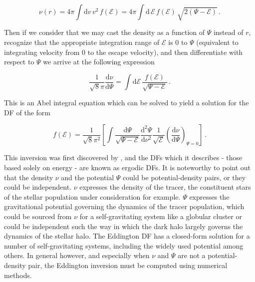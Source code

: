 \begin{equation}
    \label{ch1:eq:spherical-df-density}
    \nu(r) = 4\pi \int \mathrm{d} v \, v^{2} \, f(\mathcal{E}) = 4\pi \int \mathrm{d} \, \mathcal{E} \, f(\mathcal{E}) \, \sqrt{ 2(\Psi - \mathcal{E}) }\,.
\end{equation}

\noindent Then if we consider that we may cast the density as a function of $\Psi$ instead of $r$, recognize that the appropriate integration range of $\mathcal{E}$ is 0 to $\Psi$ (equivalent to integrating velocity from 0 to the escape velocity), and then differentiate with respect to $\Psi$ we arrive at the following expression

\begin{equation}
    \label{ch1:eq:spherical-df-density-derivative}
    \frac{1}{\sqrt{8}\pi} \frac{\mathrm{d} \nu}{\mathrm{d} \Psi} =  \int \mathrm{d} \mathcal{E} \, \frac{ f(\mathcal{E}) }{ \sqrt{\Psi - \mathcal{E}} }\,.
\end{equation}

\noindent This is an Abel integral equation which can be solved to yield a solution for the DF of the form

\begin{equation}
    \label{ch1:eq:eddington-inversion-df}
    f(\mathcal{E}) = \frac{1}{\sqrt{8}\pi^2} \left[ \int \frac{\mathrm{d} \Psi}{\sqrt{\Psi - \mathcal{E}}} \frac{\mathrm{d}^{2} \Psi}{\mathrm{d}\nu^{2}} \frac{1}{\sqrt{\mathcal{E}}} \left( \frac{\mathrm{d} \nu}{\mathrm{d} \Psi} \right)_{\Psi = 0} \right] \,.
\end{equation}

This inversion was first discovered by \textcite{eddington16}, and the DFs which it describes - those based solely on energy - are known as ergodic DFs. It is noteworthy to point out that the density $\nu$ and the potential $\Psi$ could be potential-density pairs, or they could be independent. $\nu$ expresses the density of the tracer, the constituent stars of the stellar population under consideration for example. $\Psi$ expresses the gravitational potential governing the dynamics of the tracer population, which could be sourced from $\nu$ for a self-gravitating system like a globular cluster or could be independent such the way in which the dark halo largely governs the dynamics of the stellar halo. The Eddington DF has a closed-form solution for a number of self-gravitating systems, including the widely used \textcite{hernquist90} potential among others. In general however, and especially when $\nu$ and $\Psi$ are not a potential-density pair, the Eddington inversion must be computed using numerical methods.

